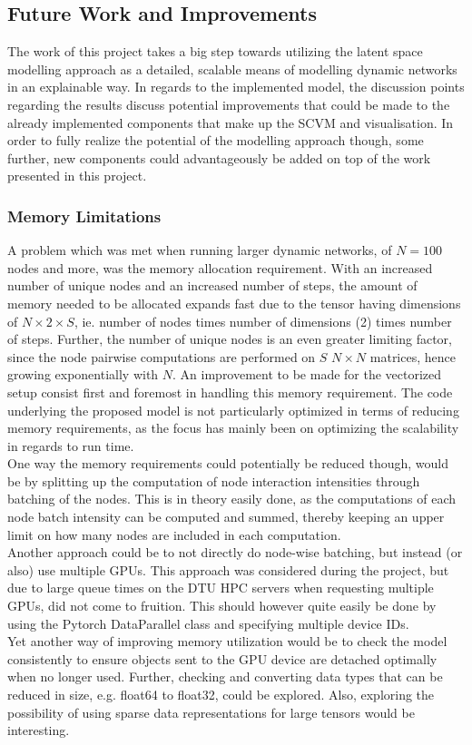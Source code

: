\subsection{Future Work and Improvements}
\label{sec:Discussion:FutureWork}
The work of this project takes a big step towards utilizing the latent space modelling approach as a detailed, scalable means of modelling dynamic networks in an explainable way.
In regards to the implemented model, the discussion points regarding the results discuss potential improvements that could be made to the already implemented components that make up the SCVM and visualisation. 
In order to fully realize the potential of the modelling approach though, some further, new components could advantageously be added on top of the work presented in this project.


\subsubsection{Memory Limitations}
\label{sec:Discussion:FutureWork:MemoryLimitations}
A problem which was met when running larger dynamic networks, of $N = 100$ nodes and more, was the memory allocation requirement.
With an increased number of unique nodes and an increased number of steps, the amount of memory needed to be allocated expands fast due to the tensor having dimensions of $N \times 2 \times S$, ie. number of nodes times number of dimensions (2) times number of steps. 
Further, the number of unique nodes is an even greater limiting factor, since the node pairwise computations are performed on $S$ $N \times N$ matrices, hence growing exponentially with $N$.
An improvement to be made for the vectorized setup consist first and foremost in handling this memory requirement. 
The code underlying the proposed model is not particularly optimized in terms of reducing memory requirements, as the focus has mainly been on optimizing the scalability in regards to run time. 
\\
One way the memory requirements could potentially be reduced though, would be by splitting up the computation of node interaction intensities through batching of the nodes. 
This is in theory easily done, as the computations of each node batch intensity can be computed and summed, thereby keeping an upper limit on how many nodes are included in each computation. 
\\
Another approach could be to not directly do node-wise batching, but instead (or also) use multiple GPUs. 
This approach was considered during the project, but due to large queue times on the DTU HPC servers when requesting multiple GPUs, did not come to fruition. 
This should however quite easily be done by using the Pytorch DataParallel \cite{DataParallelDocumentation} class and specifying multiple device IDs. 
\\
Yet another way of improving memory utilization would be to check the model consistently to ensure objects sent to the GPU device are detached optimally when no longer used.
Further, checking and converting data types that can be reduced in size, e.g. float64 to float32, could be explored.
Also, exploring the possibility of using sparse data representations \cite{Torch.sparseDocumentation} for large tensors would be interesting.


